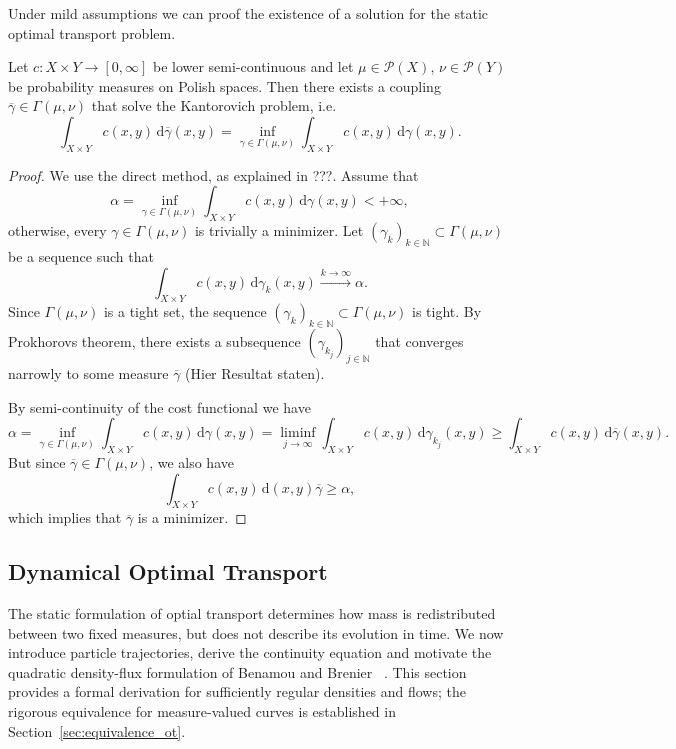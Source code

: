 Under mild assumptions we can proof the existence of a solution for the static optimal transport problem.
\begin{theorem}
	Let $c:X\times Y\to [0,\infty]$ be lower semi-continuous and let $\mu\in\mathscr{P}(X),\,\nu\in\mathscr{P}(Y)$ be probability measures on Polish spaces. Then there exists a coupling $\overline{\gamma}\in\Gamma(\mu,\nu)$ that solve the Kantorovich problem, i.e.
	$$
	\int_{X\times Y} c(x,y)\,\mathrm{d}\overline{\gamma}(x,y) = \inf_{\gamma\in\Gamma(\mu,\nu)}\int_{X\times Y} c(x,y)\,\mathrm{d}\gamma(x,y).
	$$
\end{theorem}
\begin{proof}
We use the direct method, as explained in ???. Assume that 
$$
\alpha = \inf_{\gamma\in\Gamma(\mu,\nu)}\int_{X\times Y} c(x,y)\,\mathrm{d}\gamma(x,y)< +\infty,
$$
otherwise, every $\gamma\in\Gamma(\mu,\nu)$ is trivially a minimizer. Let $(\gamma_k)_{k\in \mathbb{N}}\subset\Gamma(\mu,\nu)$ be a sequence such that
$$
\int_{X\times Y} c(x,y)\,\mathrm{d}\gamma_k(x,y) \overset{k\to\infty}{\longrightarrow}\alpha.
$$
Since $\Gamma(\mu,\nu)$ is a tight set, the sequence $(\gamma_k)_{k\in \mathbb{N}} \subset \Gamma(\mu,\nu)$ is tight. By Prokhorovs theorem, there exists a subsequence $(\gamma_{k_j})_{j\in \mathbb{N}}$ that converges narrowly to some measure $\overline{\gamma}$ (Hier Resultat staten).

By semi-continuity of the cost functional we have
$$
\alpha = \inf_{\gamma\in\Gamma(\mu,\nu)}\int_{X\times Y} c(x,y)\,\mathrm{d}\gamma(x,y) = \liminf_{j\to\infty} \int_{X\times Y} c(x,y)\,\mathrm{d}\gamma_{k_j}(x,y) \geq \int_{X\times Y} c(x,y)\,\mathrm{d}\overline{\gamma}(x,y).
$$
But since $\overline{\gamma}\in\Gamma(\mu,\nu)$, we also have
$$
\int_{X\times Y}c(x,y)\,\mathrm{d}(x,y)\overline{\gamma}\geq\alpha,
$$
which implies that $\overline{\gamma}$ is a minimizer.

\end{proof}

\subsection{Dynamical Optimal Transport}
\label{sec:dynamical_ot}
The static formulation of optial transport determines how mass is redistributed between two fixed measures, but does not describe its evolution in time. We now introduce particle trajectories, derive the continuity equation and motivate the quadratic density-flux formulation of Benamou and Brenier ~\cite{BB2000}. This section provides a formal derivation for sufficiently regular densities and flows; the rigorous equivalence for measure-valued curves is established in Section~\ref{sec:equivalence_ot}. %

